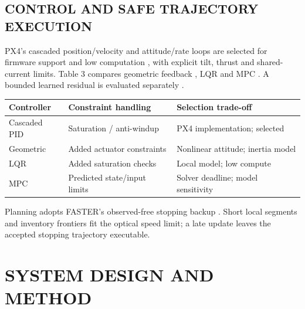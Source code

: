 \documentclass[a4paper,11pt]{article}
\begin{document}
\subsection{C{\fontsize{9.2}{14}\selectfont ONTROL} {\fontsize{9.2}{14}\selectfont AND} {\fontsize{9.2}{14}\selectfont SAFE} {\fontsize{9.2}{14}\selectfont TRAJECTORY} {\fontsize{9.2}{14}\selectfont EXECUTION}}
PX4’s cascaded position/velocity and attitude/rate loops are selected for firmware support and low computation \cite{r42}, with explicit tilt, thrust and shared-current limits. Table 3 compares geometric feedback \cite{r40}, LQR \cite{r45} and MPC \cite{r41}. A bounded learned residual is evaluated separately \cite{r28,r29}.

\par\addvspace{8pt}\noindent\begin{minipage}{\linewidth}\centering
{}\label{tab:3}
\begin{tabular}{C{0.290\dimexpr\linewidth-24pt\relax}C{0.290\dimexpr\linewidth-24pt\relax}C{0.420\dimexpr\linewidth-24pt\relax}}
\toprule
\textbf{Controller} & \textbf{Constraint handling} & \textbf{Selection trade-off}\\\midrule
Cascaded PID \cite{r42} & Saturation / anti-windup & PX4 implementation; selected\\
Geometric \cite{r40} & Added actuator constraints & Nonlinear attitude; inertia model\\
LQR \cite{r45} & Added saturation checks & Local model; low compute\\
MPC \cite{r41} & Predicted state/input limits & Solver deadline; model sensitivity\\
\bottomrule\end{tabular}\end{minipage}\par\addvspace{8pt}
Planning adopts FASTER’s observed-free stopping backup \cite{r22}. Short local segments and inventory frontiers fit the optical speed limit; a late update leaves the accepted stopping trajectory executable.

\section{S{\fontsize{11.2}{14}\selectfont YSTEM} D{\fontsize{11.2}{14}\selectfont ESIGN} {\fontsize{11.2}{14}\selectfont AND} M{\fontsize{11.2}{14}\selectfont ETHOD}}
\end{document}
